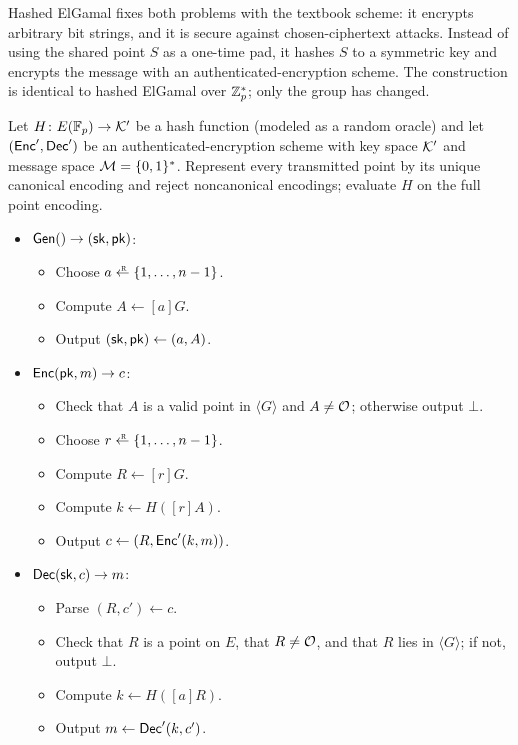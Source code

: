 Hashed ElGamal fixes both problems with the textbook scheme: it encrypts
arbitrary bit strings, and it is secure against chosen-ciphertext attacks.
Instead of using the shared point $S$ as a one-time pad, it hashes $S$ to
a symmetric key and encrypts the message with an authenticated-encryption
scheme.
The construction is identical to hashed ElGamal over $\mathbb{Z}^*_p$; only the
group has changed.

\begin{definition}
Let $H \colon E(\mathbb{F}_p) \to \mathcal{K}'$ be a hash function (modeled as a random
oracle) and let $(\mathsf{Enc}', \mathsf{Dec}')$ be an authenticated-encryption scheme
with key space $\mathcal{K}'$ and message space $\mathcal{M} = \{0,1\}^*$.
Represent every transmitted point by its unique canonical encoding and
reject noncanonical encodings; evaluate $H$ on the full point encoding.
\begin{itemize}
  \item $\mathsf{Gen}() \to ({\mathsf{sk}}, \mathsf{pk})$:
    \begin{itemize}[noitemsep]
      \item Choose $a \getsr \{1, \dots, n-1\}$.
      \item Compute $A \gets [a]G$.
      \item Output $({\mathsf{sk}}, \mathsf{pk}) \gets (a, A)$.
    \end{itemize}
  \item $\mathsf{Enc}(\mathsf{pk}, m) \to c$:
    \begin{itemize}[noitemsep]
      \item Check that $A$ is a valid point in $\langle G\rangle$
            and $A \neq \mathcal{O}$; otherwise output $\bot$.
      \item Choose $r \getsr \{1, \dots, n-1\}$.
      \item Compute $R \gets [r]G$.
      \item Compute $k \gets H([r]A)$.
      \item Output $c \gets (R, \mathsf{Enc}'(k, m))$.
    \end{itemize}
  \item $\mathsf{Dec}({\mathsf{sk}}, c) \to m$:
    \begin{itemize}[noitemsep]
      \item Parse $(R, c') \gets c$.
      \item Check that $R$ is a point on $E$, that $R \neq \mathcal{O}$, and
            that $R$ lies in $\langle G \rangle$; if not, output $\bot$.
      \item Compute $k \gets H([a]R)$.
      \item Output $m \gets \mathsf{Dec}'(k, c')$.
    \end{itemize}
\end{itemize}
\end{definition}


